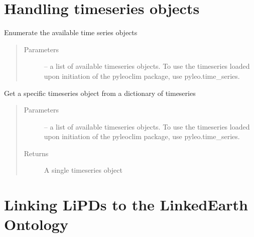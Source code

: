 \documentclass[letterpaper,10pt,english]{sphinxmanual}
\begin{document}
\section{Handling timeseries objects}
\label{\detokenize{LipdUtils:handling-timeseries-objects}}

\begin{fulllineitems}
\label{\detokenize{LipdUtils:pyleoclim.LipdUtils.enumerateTs}}
Enumerate the available time series objects
\begin{quote}\begin{description}
\item[{Parameters}] \leavevmode
{} -- a  list of available timeseries objects.
To use the timeseries loaded upon initiation of the
pyleoclim package, use pyleo.time\_series.

\end{description}\end{quote}

\end{fulllineitems}


\begin{fulllineitems}
\label{\detokenize{LipdUtils:pyleoclim.LipdUtils.getTs}}
Get a specific timeseries object from a dictionary of timeseries
\begin{quote}\begin{description}
\item[{Parameters}] \leavevmode
{} -- a  list of available timeseries objects.
To use the timeseries loaded upon initiation of the
pyleoclim package, use pyleo.time\_series.

\item[{Returns}] \leavevmode
A single timeseries object

\end{description}\end{quote}

\end{fulllineitems}



\section{Linking LiPDs to the LinkedEarth Ontology}
\label{\detokenize{LipdUtils:linking-lipds-to-the-linkedearth-ontology}}
\end{document}
